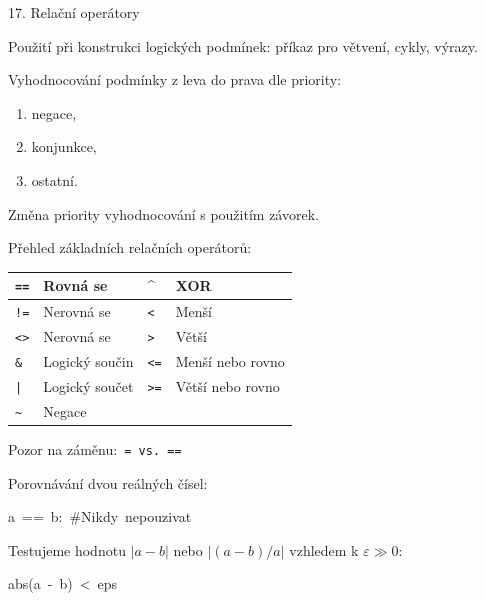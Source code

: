 \documentclass[czech]{beamer}
\providecommand{\tabularnewline}{\\}
\newenvironment{lyxcode}
  {\par\begin{list}{}{
    \setlength{\rightmargin}{\leftmargin}
    \setlength{\listparindent}{0pt}%
    \raggedright
    \setlength{\itemsep}{0pt}
    \setlength{\parsep}{0pt}
    \normalfont\ttfamily}%
   \def\{{\char`\{}
   \def\}{\char`\}}
   \def\textasciitilde{\char`\~}
   \item[]}
  {\end{list}}
\begin{document}
\begin{frame}[plain]{17. Relační operátory}

{\tiny Použití při konstrukci logických podmínek: příkaz pro větvení,
cykly, výrazy.\medskip{}
}{\tiny\par}

{\tiny Vyhodnocování podmínky z leva do prava dle priority:}{\tiny\par}
\begin{enumerate}
\item {\tiny negace,}{\tiny\par}
\item {\tiny konjunkce,}{\tiny\par}
\item {\tiny ostatní.}{\tiny\par}
\end{enumerate}
{\tiny Změna priority vyhodnocování s použitím závorek.}{\tiny\par}

{\tiny Přehled základních relačních operátorů:}

{\tiny\par}\begin{center}
{\tiny{}%
\begin{tabular}{|l|>{\raggedright}p{3cm}|>{\raggedright}p{0.5cm}|>{\raggedright}p{3cm}|}
\hline 
{\tiny\texttt{==}}{\tiny{} } & {\tiny Rovná se} & {\tiny\textasciicircum} & {\tiny XOR}\tabularnewline
\hline 
{\tiny\texttt{!=}}{\tiny{} } & {\tiny Nerovná se} & {\tiny\texttt{<}}{\tiny{} } & {\tiny Menší}\tabularnewline
\hline 
{\tiny\texttt{<>}}{\tiny{} } & {\tiny Nerovná se} & {\tiny\texttt{>}}{\tiny{} } & {\tiny Větší}\tabularnewline
\hline 
{\tiny\texttt{\&}} & {\tiny Logický součin} & {\tiny\texttt{<=}}{\tiny{} } & {\tiny Menší nebo rovno}\tabularnewline
\hline 
{\tiny\texttt{|}} & {\tiny Logický součet} & {\tiny\texttt{>=}}{\tiny{} } & {\tiny Větší nebo rovno}\tabularnewline
\hline 
{\tiny\texttt{\textasciitilde}}{\tiny{} } & {\tiny Negace} &  & \tabularnewline
\hline 
\end{tabular}}{\tiny\par}
\par\end{center}

{\tiny Pozor na záměnu:}{\tiny\texttt{ = vs. ==}}{\tiny\par}

{\tiny Porovnávání dvou reálných čísel: }{\tiny\par}
\begin{lyxcode}
{\tiny a~==~b:~\#Nikdy~nepouzivat}{\tiny\par}
\end{lyxcode}
{\tiny Testujeme hodnotu $\left|a-b\right|$ nebo $\left|(a-b)/a\right|$
vzhledem k $\varepsilon\gg0$:}{\tiny\par}
\begin{lyxcode}
{\tiny abs(a~-~b)~<~eps}{\tiny\par}
\end{lyxcode}
\end{frame}
\end{document}
